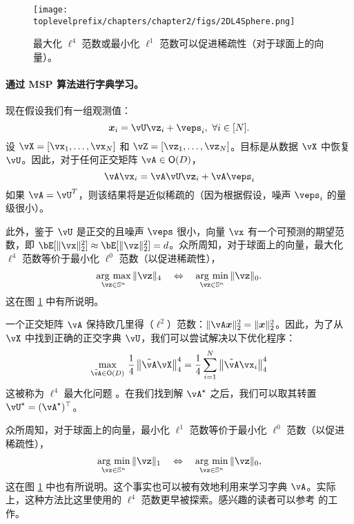 \documentclass[../../book-main_zh.tex]{subfiles}
\begin{document}
\begin{figure}
    \centering
    \texttt{[image: \\toplevelprefix/chapters/chapter2/figs/2DL4Sphere.png]}\vspace{-0.1in}
    \caption{最大化 $\ell^4$ 范数或最小化 $\ell^1$ 范数可以促进稀疏性（对于球面上的向量）。}
    \label{fig:L4-sphere}
\end{figure}


\paragraph{通过 MSP 算法进行字典学习。}

现在假设我们有一组观测值：
\begin{equation}
    \x_i = \vU \vz_i + \veps_i,\ \forall i \in [N].
\end{equation}
设 $\vX = [\vx_1, \dots, \vx_N]$ 和 $\vZ = [\vz_1, \dots, \vz_N]$。目标是从数据 $\vX$ 中恢复 $\vU$。因此，对于任何正交矩阵 $\vA \in \O(D)$，
\begin{equation}
    \vA\vx_i = \vA\vU \vz_i + \vA\veps_i
\end{equation}
如果 $\vA = \vU^T$，则该结果将是近似稀疏的（因为根据假设，噪声 $\veps_i$ 的量级很小）。

此外，鉴于 $\vU$ 是正交的且噪声 $\veps$ 很小，向量 $\vx$ 有一个可预测的期望范数，即 $\bE[\norm{\vx}_2^2] \approx \bE[\norm{\vz}_2^2]=d$。众所周知，对于球面上的向量，最大化 $\ell^4$ 范数等价于最小化 $\ell^0$ 范数（以促进稀疏性），
\begin{equation}
    \argmax_{\vz \in \mathbb{S}^n}\|\vz\|_{4}\quad\Leftrightarrow\quad \argmin_{\vz \in \mathbb{S}^n}\|\vz\|_{0}.
\end{equation}
这在图 \ref{fig:L4-sphere} 中有所说明。

一个正交矩阵 $\vA$ 保持欧几里得（\(\ell^{2}\)）范数：$\|\vA \x\|_2^2 = \|\x\|_2^2$。因此，为了从 $\vX$ 中找到正确的正交字典 $\vU$，我们可以尝试解决以下优化程序：
\begin{equation}\label{eq0:orthogonal-dictionary-learning-l4}
    \max_{\tilde{\vA} \in \O(D)}\,
     \frac{1}{4} \norm*{
    \tilde{\vA} \vX
    }_4^4 =  \frac{1}{4} \sum_{i=1}^N \norm*{
        \tilde{\vA} \vx_i
    }_4^4
\end{equation}
这被称为 $\ell^4$ 最大化问题 \cite{Zhai-2020}。在我们找到解 \(\vA^{\star}\) 之后，我们可以取其转置 \(\vU^{\star} = (\vA^{\star})^{\top}\)。
\begin{remark}
    众所周知，对于球面上的向量，最小化 $\ell^1$ 范数等价于最小化 $\ell^0$ 范数（以促进稀疏性），
\begin{equation*}
            \argmin_{\vz \in \mathbb{S}^n}\|\vz\|_{1}\quad\Leftrightarrow\quad \argmin_{\vz \in \mathbb{S}^n}\|\vz\|_{0},
\end{equation*}
这在图 \ref{fig:L4-sphere} 中也有所说明。这个事实也可以被有效地利用来学习字典 $\vA$。实际上，这种方法比这里使用的 $\ell^4$ 范数更早被探索。感兴趣的读者可以参考 \cite{qu2020findingsparsestvectorssubspace} 的工作。
\end{remark}
\end{document}
